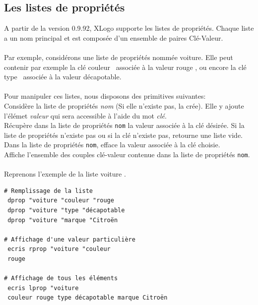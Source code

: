 \subsection{Les listes de propriétés}
A partir de la version 0.9.92, XLogo supporte les listes de propriétés. Chaque liste a un nom principal et est composée d'un ensemble de paires  Clé-Valeur.\\ \\
Par exemple, considérons une liste de propriétés nommée \og voiture\fg. Elle peut contenir par exemple la clé \og couleur \fg\ associée à la valeur \og rouge \fg, ou encore la clé \og type \fg\ associée à la valeur \og décapotable\fg.\\ \\
Pour manipuler ces listes, nous disposons des primitives suivantes:\\
 Considère la liste de propriétés \textit{nom} (Si elle n'existe pas, la crée). Elle y ajoute l'élémet \textit{valeur} qui sera accessible à l'aide du mot \textit{clé}.\\
 Récupère dans la liste de propriétés \texttt{nom} la valeur associée à la clé désirée. Si la liste de propriétés n'existe pas ou si la clé n'existe pas, retourne une liste vide.\\
 Dans la liste de propriétés \texttt{nom}, efface la valeur associée à la clé choisie.\\
Affiche l'ensemble des couples clé-valeur contenue dans la liste de propriétés \texttt{nom}.\\ \\
Reprenons l'exemple de la liste \og voiture \fg.
\begin{verbatim}
# Remplissage de la liste 
 dprop "voiture "couleur "rouge
 dprop "voiture "type "décapotable
 dprop "voiture "marque "Citroën

# Affichage d'une valeur particulière
 ecris rprop "voiture "couleur
 rouge

# Affichage de tous les éléments
 ecris lprop "voiture
 couleur rouge type décapotable marque Citroën
\end{verbatim}
